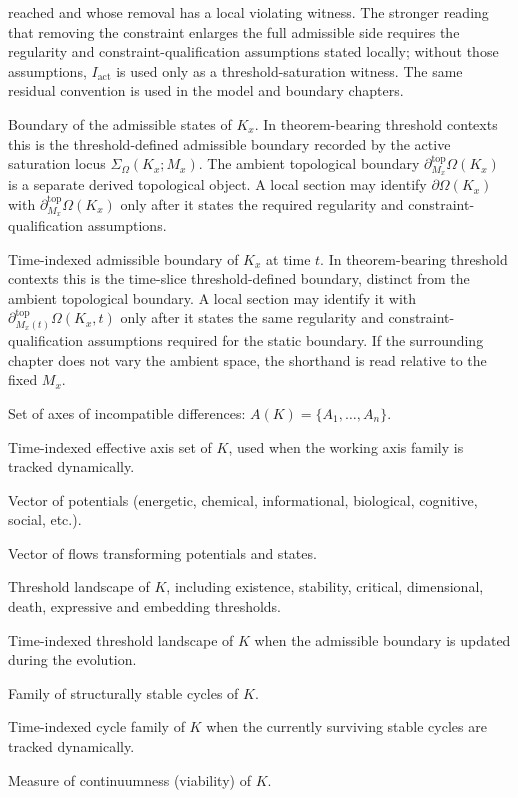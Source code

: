 \begin{description}
        reached and whose removal has a local violating witness. The stronger
        reading that removing the constraint enlarges the full admissible side
        requires the regularity and constraint-qualification assumptions stated
        locally; without those assumptions, \(I_{\mathrm{act}}\) is used only as
        a threshold-saturation witness. The same residual convention is used in
        the model and boundary chapters.
  \item[\(\partial\Omega(K_x)\)] Boundary of the admissible states of \(K_x\).
        In theorem-bearing threshold contexts this is the threshold-defined
        admissible boundary recorded by the active saturation locus
        \(\Sigma_{\Omega}(K_x;M_x)\). The ambient topological boundary
        \(\partial_{M_x}^{\mathrm{top}}\Omega(K_x)\) is a separate derived
        topological object. A local section may identify
        \(\partial\Omega(K_x)\) with
        \(\partial_{M_x}^{\mathrm{top}}\Omega(K_x)\) only after it states the
        required regularity and constraint-qualification assumptions.
  \item[\(\partial\Omega(K_x,t)\)] Time-indexed admissible boundary of \(K_x\)
        at time \(t\). In theorem-bearing threshold contexts this is the
        time-slice threshold-defined boundary, distinct from the ambient
        topological boundary. A local section may identify it with
        \(\partial_{M_x(t)}^{\mathrm{top}}\Omega(K_x,t)\) only after it states
        the same regularity and constraint-qualification assumptions required
        for the static boundary. If the surrounding chapter does not vary the
        ambient space, the shorthand is read relative to the fixed \(M_x\).
  \item[\(A(K)\)] Set of axes of incompatible differences:
        \(A(K) = \{A_1,\dots,A_n\}\).
  \item[\(A(K,t)\)] Time-indexed effective axis set of \(K\), used when the
        working axis family is tracked dynamically.
  \item[\(P(t)\)] Vector of potentials (energetic, chemical, informational,
        biological, cognitive, social, etc.).
  \item[\(J(t)\)] Vector of flows transforming potentials and states.
  \item[\(\Theta(K)\)] Threshold landscape of \(K\), including existence,
        stability, critical, dimensional, death, expressive and embedding
        thresholds.
  \item[\(\Theta(K,t)\)] Time-indexed threshold landscape of \(K\) when the
        admissible boundary is updated during the evolution.
  \item[\(C(K)\)] Family of structurally stable cycles of \(K\).
  \item[\(C(K,t)\)] Time-indexed cycle family of \(K\) when the currently
        surviving stable cycles are tracked dynamically.
  \item[\(k(K,t)\)] Measure of continuumness (viability) of \(K\).
\end{description}

